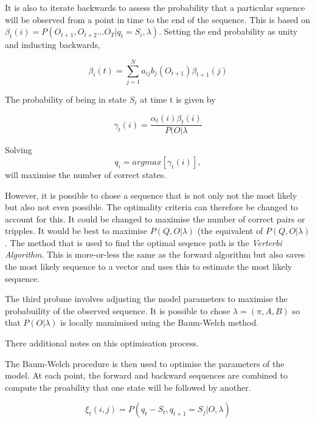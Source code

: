 \documentclass[12pt, a4paper, oneside]{article} %
\begin{document}
It is also to iterate backwards to assess the probability that a particular squence will be observed from a point in time to the end of the sequence.  This is based on $\beta_t(i) = P(O_{t+1}, O_{t+2}\dots O_T| q_t = S_i, \lambda)$. Setting the end probability as unity and inducting backwards, 

\begin{equation} 
\beta_i(t) = \sum_{j = 1}^N a_{ij}b_j(O_{t+1})\beta_{t+1}(j)
\end{equation}

The probability of being in state $S_i$ at time t is given by 

\begin{equation}
\gamma_t(i) = \frac{\alpha_t(i)\beta_t(i)}{P(O|\lambda}
\end{equation}

Solving
\begin{equation}
q_i = argmax [\gamma_t(i)], %
\end{equation}
will maximise the number of correct states. 

However, it is possible to chose a sequence that is not only not the most likely but also not even possible.  The optimality criteria can therefore be changed to account for this.  It could be changed to maximise the number of correct pairs or tripples. It would be best to maximise $P(Q, O |\lambda)$ (the equivalent of $P(Q, O| \lambda)$.  The method that is used to find the optimal seqence path is the \emph{Verterbi Algorithm}.  This is more-or-less the same as the forward algorithm but also saves the most likely sequence to a vector and uses this to estimate the most likely sequence. 

The third probme involves adjusting the model parameters to maximise the probabuility of the observed sequence. It is possible to chose $\lambda = (\pi, A, B)$ so that $P(O|\lambda)$ is locally mamimised using the Baum-Welch method. 

There additional notes on this optimisation process. 

The Baum-Welch procedure is then used to optimise the parameters of the model.  At each point, the forward and backward sequences are combined to compute the proability that one state will be followed by another. 

\begin{equation}
\xi_t(i,j) = P(q_t - S_t, q_{t+1} = S_j| O, \lambda)
\end{equation}
\end{document}
